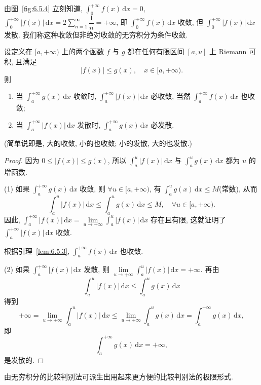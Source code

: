 由图~\ref{fig:6.5.4} 立刻知道, $\int_{0}^{+\infty}f(x)\,\mathrm{d}x=0$, $\int_{0}^{+\infty}|f(x)|\,\mathrm{d}x=2\sum\limits_{n=1}^{\infty}\dfrac{1}{n}=+\infty$, 即 $\int_{0}^{+\infty}f(x)\,\mathrm{d}x$ 收敛, 但 $\int_{0}^{+\infty}|f(x)|\,\mathrm{d}x$ 发散. 我们称这种收敛但非绝对收敛的无穷积分为条件收敛.

\begin{theorem}[无穷积分的比较判别法]\label{thm:6.5.3}
设定义在 $[a,+\infty)$ 上的两个函数 $f$ 与 $g$ 都在任何有限区间 $[a,u]$ 上 Riemann 可积, 且满足
\[
|f(x)|\leqslant g(x),\quad x\in[a,+\infty).
\]
则
\begin{enumerate}[label=(\arabic*)]
\item 当 $\int_{a}^{+\infty}g(x)\,\mathrm{d}x$ 收敛时, $\int_{a}^{+\infty}|f(x)|\,\mathrm{d}x$ 必收敛, 当然 $\int_{a}^{+\infty}f(x)\,\mathrm{d}x$ 也收敛;
\item 当 $\int_{a}^{+\infty}|f(x)|\,\mathrm{d}x$ 发散时, $\int_{a}^{+\infty}g(x)\,\mathrm{d}x$ 必发散.
\end{enumerate}
(简单说即是, 大的收敛, 小的也收敛; 小的发散, 大的也发散.)
\end{theorem}

\begin{proof}
因为 $0\leqslant|f(x)|\leqslant g(x)$, 所以 $\int_{a}^{u}|f(x)|\,\mathrm{d}x$ 与 $\int_{a}^{u}g(x)\,\mathrm{d}x$ 都为 $u$ 的增函数.

(1) 如果 $\int_{a}^{+\infty}g(x)\,\mathrm{d}x$ 收敛, 则 $\forall u\in[a,+\infty)$, 有 $\int_{a}^{u}g(x)\,\mathrm{d}x\leqslant M$(常数), 从而
\[
\int_{a}^{u}|f(x)|\,\mathrm{d}x\leqslant\int_{a}^{u}g(x)\,\mathrm{d}x\leqslant M,\quad\forall u\in[a,+\infty).
\]
因此, $\int_{a}^{+\infty}|f(x)|\,\mathrm{d}x=\lim\limits_{u\to+\infty}\int_{a}^{u}|f(x)|\,\mathrm{d}x$ 存在且有限, 这就证明了 $\int_{a}^{+\infty}|f(x)|\,\mathrm{d}x$ 收敛.

根据引理~\ref{lem:6.5.3}, $\int_{a}^{+\infty}f(x)\,\mathrm{d}x$ 也收敛.

(2) 如果 $\int_{a}^{+\infty}|f(x)|\,\mathrm{d}x$ 发散, 则 $\lim\limits_{u\to+\infty}\int_{a}^{u}|f(x)|\,\mathrm{d}x=+\infty$. 再由
\[
\int_{a}^{u}|f(x)|\,\mathrm{d}x\leqslant\int_{a}^{u}g(x)\,\mathrm{d}x
\]
得到
\[
+\infty=\lim_{u\to+\infty}\int_{a}^{u}|f(x)|\,\mathrm{d}x\leqslant\lim_{u\to+\infty}\int_{a}^{u}g(x)\,\mathrm{d}x=\int_{a}^{+\infty}g(x)\,\mathrm{d}x,
\]
即
\[
\int_{a}^{+\infty}g(x)\,\mathrm{d}x=+\infty,
\]
是发散的.
\end{proof}

由无穷积分的比较判别法可派生出用起来更方便的比较判别法的极限形式.

